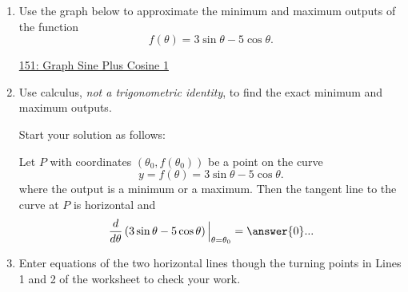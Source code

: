 \documentclass{ximera}
\begin{document}
\begin{exercise}  \label{Ex983vbvx}
\begin{enumerate}
\item Use the graph below to approximate the minimum and maximum outputs of the function
\[
      f(\theta) = 3\sin\theta - 5\cos\theta .
\] 

\begin{onlineOnly}
    \begin{center}
\end{center}
\end{onlineOnly}

\href{https://www.desmos.com/calculator/msxpibv77r}{151: Graph Sine Plus Cosine 1}

\item Use calculus, \emph{not a trigonometric identity}, to find the exact minimum and maximum outputs.

Start your solution as follows:

Let $P$ with coordinates $(\theta_0 , f(\theta_0))$ be a point on the curve
\[
      y = f(\theta) =  3\sin\theta - 5\cos\theta .
\] 
where the output is a minimum or a maximum. Then the tangent line to the curve at $P$ is horizontal and
\[
     \frac{d}{d\theta} \left( 3\sin\theta - 5\cos\theta \right)\Big|_{\theta=\theta_0} = \answer{0}...
\]

\item Enter equations of the two horizontal lines though the turning points in Lines 1 and 2 of the worksheet to check your work.
\end{enumerate}

\end{exercise}
\end{document}
